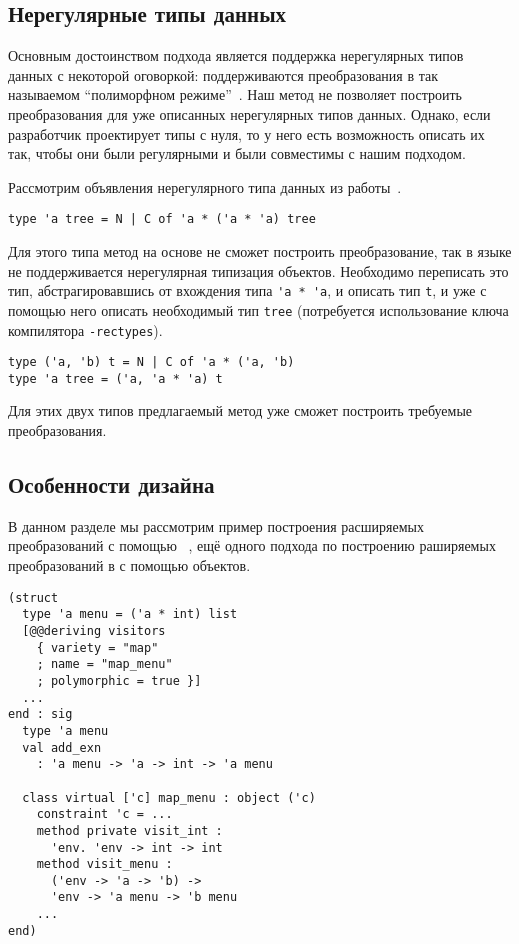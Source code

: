 \subsection{Нерегулярные типы данных}
\label{sec:irregular}

Основным достоинством подхода \visitors{} является поддержка нерегулярных типов данных с некоторой оговоркой: поддерживаются преобразования в так называемом ``полиморфном режиме''~\cite{Visitors}. Наш метод не позволяет построить преобразования для уже описанных нерегулярных типов данных. Однако, если разработчик проектирует типы с нуля, то у него есть возможность описать их так, чтобы они были регулярными и были совместимы с нашим подходом. 

Рассмотрим объявления нерегулярного типа данных  из работы~\cite{irregular}.

\begin{lstlisting}
type 'a tree = N | C of 'a * ('a * 'a) tree
\end{lstlisting}
\noindent Для этого типа метод на основе \GT{} не сможет построить преобразование, так в языке \ocaml{} не поддерживается нерегулярная типизация объектов. Необходимо переписать это тип, абстрагировавшись от вхождения типа \lstinline{'a * 'a}, и описать тип \lstinline{t}, и уже с помощью него описать  необходимый тип \lstinline{tree} (потребуется использование ключа компилятора \texttt{-rectypes}).
\begin{lstlisting}
type ('a, 'b) t = N | C of 'a * ('a, 'b)
type 'a tree = ('a, 'a * 'a) t 
\end{lstlisting}
\noindent Для этих двух типов предлагаемый метод уже сможет построить требуемые преобразования.

\subsection{Особенности дизайна}
\label{sec:design}

В данном разделе мы рассмотрим пример построения расширяемых преобразований с помощью \visitors~\cite{Visitors}, ещё одного подхода по построению раширяемых преобразований в \OCaml{} с помощью объектов.

\begin{lstlisting}
(struct 
  type 'a menu = ('a * int) list
  [@@deriving visitors 
    { variety = "map"
    ; name = "map_menu"
    ; polymorphic = true }]
  ...
end : sig 
  type 'a menu 
  val add_exn
    : 'a menu -> 'a -> int -> 'a menu
    
  class virtual ['c] map_menu : object ('c)
    constraint 'c = ...
    method private visit_int : 
      'env. 'env -> int -> int
    method visit_menu :
      ('env -> 'a -> 'b) -> 
      'env -> 'a menu -> 'b menu
    ...
end)
\end{lstlisting}

